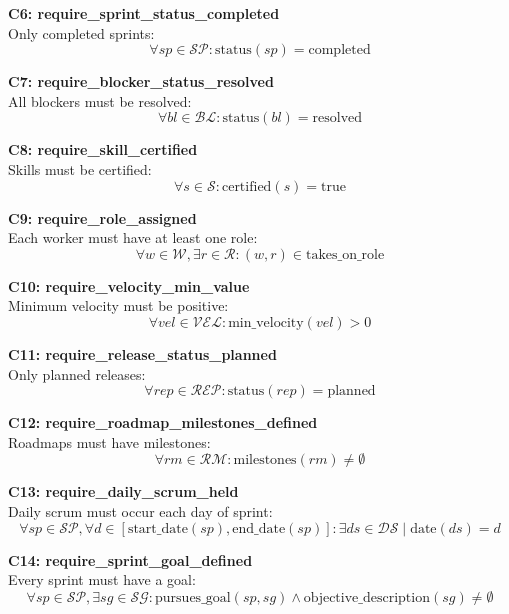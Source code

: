 \documentclass[12pt]{article}
\begin{document}
    \item \textbf{C6: require\_sprint\_status\_completed} \\
    Only completed sprints:
    \[
    \forall sp \in \mathcal{SP}: \text{status}(sp) = \text{completed}
    \]

    \item \textbf{C7: require\_blocker\_status\_resolved} \\
    All blockers must be resolved:
    \[
    \forall bl \in \mathcal{BL}: \text{status}(bl) = \text{resolved}
    \]

    \item \textbf{C8: require\_skill\_certified} \\
    Skills must be certified:
    \[
    \forall s \in \mathcal{S}: \text{certified}(s) = \text{true}
    \]

    \item \textbf{C9: require\_role\_assigned} \\
    Each worker must have at least one role:
    \[
    \forall w \in \mathcal{W}, \exists r \in \mathcal{R}: (w, r) \in \text{takes\_on\_role}
    \]

    \item \textbf{C10: require\_velocity\_min\_value} \\
    Minimum velocity must be positive:
    \[
    \forall vel \in \mathcal{VEL}: \text{min\_velocity}(vel) > 0
    \]

    \item \textbf{C11: require\_release\_status\_planned} \\
    Only planned releases:
    \[
    \forall rep \in \mathcal{REP}: \text{status}(rep) = \text{planned}
    \]

    \item \textbf{C12: require\_roadmap\_milestones\_defined} \\
    Roadmaps must have milestones:
    \[
    \forall rm \in \mathcal{RM}: \text{milestones}(rm) \neq \emptyset
    \]

    \item \textbf{C13: require\_daily\_scrum\_held} \\
    Daily scrum must occur each day of sprint:
    \[
    \forall sp \in \mathcal{SP}, \forall d \in [\text{start\_date}(sp), \text{end\_date}(sp)]: \exists ds \in \mathcal{DS} \mid \text{date}(ds) = d
    \]

    \item \textbf{C14: require\_sprint\_goal\_defined} \\
    Every sprint must have a goal:
    \[
    \forall sp \in \mathcal{SP}, \exists sg \in \mathcal{SG}: \text{pursues\_goal}(sp, sg) \land \text{objective\_description}(sg) \neq \emptyset
    \]
\end{document}
